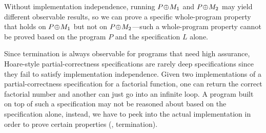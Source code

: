 Without implementation independence, running $P\!\oplus\! M_1$ and
$P\!\oplus\! M_2$ may yield different observable results, so we can prove
a specific whole-program property that holds on $P\!\oplus\! M_1$ but not on
$P\!\oplus\! M_2$---such a whole-program property cannot be proved based
on the program $P$ and the specification $L$ alone. 

Since termination is always observable 
for programs that need high assurance,
Hoare-style partial-correctness specifications are rarely
deep specifications since they fail to satisfy implementation
independence. Given two implementations of a partial-correctness
specification for a factorial function, one can return the correct
factorial number and another can just go into an infinite loop.  A
program built on top of such a specification may not be reasoned about 
based on the specification alone, instead, we have to peek into the actual
implementation in order to prove certain properties (\eg,
termination).

